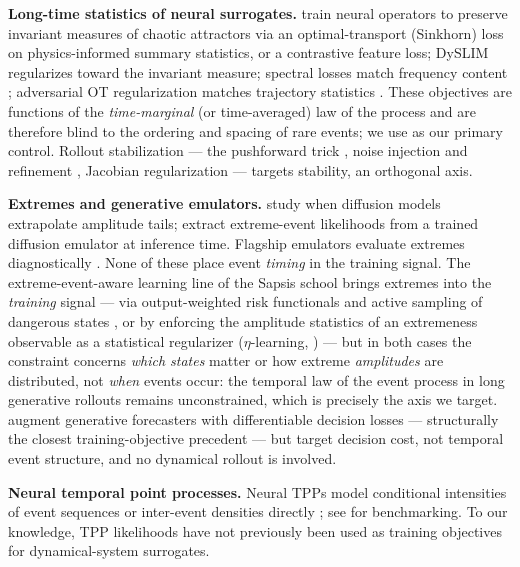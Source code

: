 \documentclass[11pt]{article}
\begin{document}
\textbf{Long-time statistics of neural surrogates.}
\citet{jiang2023training} train neural operators to preserve invariant
measures of chaotic attractors via an optimal-transport (Sinkhorn) loss on
physics-informed summary statistics, or a contrastive feature loss; DySLIM
\citep{schiff2024dyslim} regularizes toward the invariant measure; spectral
losses match frequency content \citep{chakraborty2026binned}; adversarial OT
regularization matches trajectory statistics \citep{melo2026learning}.
These objectives are functions of the \emph{time-marginal} (or
time-averaged) law of the process and are therefore blind to the ordering
and spacing of rare events; we use \citet{jiang2023training} as our primary
control. Rollout stabilization --- the pushforward trick
\citep{brandstetter2022message}, noise injection and refinement
\citep{pedersen2025thermalizer,liu2026selfrefining}, Jacobian regularization
\citep{nie2026jaws} --- targets stability, an orthogonal axis.

\textbf{Extremes and generative emulators.}
\citet{stamatelopoulos2025diffusion} study when diffusion models extrapolate
amplitude tails; \citet{manshausen2026accurate} extract extreme-event
likelihoods from a trained diffusion emulator at inference time. Flagship
emulators evaluate extremes diagnostically
\citep{price2025probabilistic,wattmeyer2025ace2,kochkov2024neural}. None of
these place event \emph{timing} in the training signal.
The extreme-event-aware learning line of the Sapsis school brings extremes
into the \emph{training} signal --- via output-weighted risk functionals
and active sampling of dangerous states \citep{pickering2022discovering},
or by enforcing the amplitude statistics of an extremeness observable as a
statistical regularizer ($\eta$-learning, \citealp{chang2025extreme}) ---
but in both cases the constraint concerns \emph{which states} matter or
how extreme \emph{amplitudes} are distributed, not \emph{when} events
occur: the temporal law of the event process in long generative rollouts
remains unconstrained, which is precisely the axis we target.
\citet{raeth2026decision} augment generative forecasters with differentiable
decision losses --- structurally the closest training-objective precedent ---
but target decision cost, not temporal event structure, and no dynamical
rollout is involved.

\textbf{Neural temporal point processes.}
Neural TPPs model conditional intensities of event sequences
\citep{mei2017neural} or inter-event densities directly
\citep{shchur2020intensity}; see \citep{aalaila2026seahorse} for
benchmarking. To our knowledge, TPP likelihoods have not previously been
used as training objectives for dynamical-system surrogates.
\end{document}
